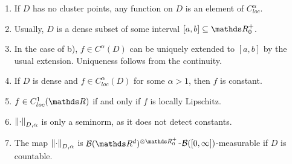 \begin{bem}
\begin{enumerate}[label=\alph*)]
\item If $D$ has no cluster points, any function on $D$ is an element of $C_{loc}^\alpha$.
\item Usually, $D$ is a dense subset of some interval $[a,b]\subseteq \R_0^+$.
\item In the case of b), $f \in C^\alpha(D)$ can be uniquely extended to $[a,b]$ by the usual extension.
Uniqueness follows from the continuity.
\item If $D$ is dense and $f \in C_{loc}^\alpha(D)$ for some $\alpha>1$, then $f$ is constant.
\item $f \in C_{loc}^1(\R)$ if and only if $f$ is locally Lipschitz.
\item $\left\lVert\cdot\right\rVert_{D,\alpha}$ is only a seminorm, as it does not detect constants.
\item The map $\left\lVert\cdot\right\rVert_{D,\alpha}$ is $\Borel(\Rd)^{\otimes \R_0^+}$-$\mathcal{B}([0,\infty])$-measurable if $D$ is countable.
\end{enumerate}
\end{bem}

